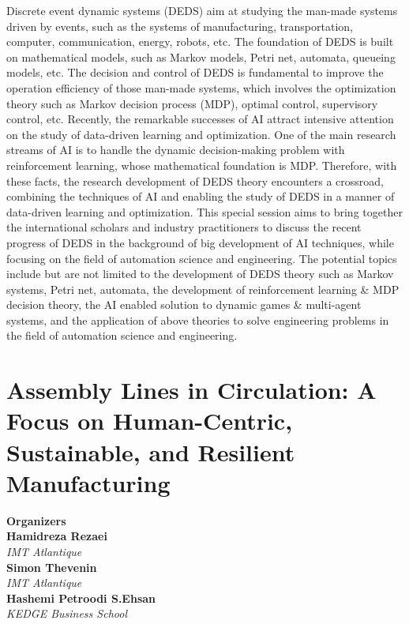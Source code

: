 Discrete event dynamic systems (DEDS) aim at studying the man-made systems driven by events, such as the systems of manufacturing, transportation, computer, communication, energy, robots, etc. The foundation of DEDS is built on mathematical models, such as Markov models, Petri net, automata, queueing models, etc. The decision and control of DEDS is fundamental to improve the operation efficiency of those man-made systems, which involves the optimization theory such as Markov decision process (MDP), optimal control, supervisory control, etc. Recently, the remarkable successes of AI attract intensive attention on the study of data-driven learning and optimization. One of the main research streams of AI is to handle the dynamic decision-making problem with reinforcement learning, whose mathematical foundation is MDP. Therefore, with these facts, the research development of DEDS theory encounters a crossroad, combining the techniques of AI and enabling the study of DEDS in a manner of data-driven learning and optimization.  This special session aims to bring together the international scholars and industry practitioners to discuss the recent progress of DEDS in the background of big development of AI techniques, while focusing on the field of automation science and engineering. The potential topics include but are not limited to the development of DEDS theory such as Markov systems, Petri net, automata, the development of reinforcement learning \& MDP decision theory, the AI enabled solution to dynamic games \& multi-agent systems, and the application of above theories to solve engineering problems in the field of automation science and engineering. 

\section{Assembly Lines in Circulation: A Focus on Human-Centric, Sustainable, and Resilient Manufacturing}


\large \textbf{Organizers} \normalsize \vspace{2mm} \\
\textbf{Hamidreza  Rezaei} \\ 
\textit{IMT Atlantique} \vspace{{2mm}} \\
\textbf{Simon  Thevenin} \\ 
\textit{IMT Atlantique} \vspace{{2mm}} \\
\textbf{Hashemi Petroodi  S.Ehsan} \\ 
\textit{KEDGE Business School}

